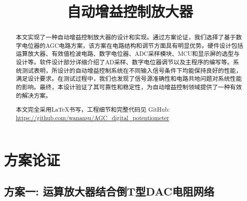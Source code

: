 \documentclass[lang=cn,11pt,a4paper]{elegantpaper}
\title{自动增益控制放大器}
\date{\zhtoday}
\begin{document}
\maketitle

\begin{abstract}
  本文实现了一种自动增益控制放大器的设计和实现。通过方案论证，我们选择了基于数字电位器的AGC电路方案，该方案在电路结构和调节方面具有明显优势。硬件设计包括运算放大器、有效值检波电路、数字电位器、ADC采样模块、MCU和显示屏的选型与设计等。软件设计部分详细介绍了AD采样、数字电位器调节以及主程序的编写等。系统测试表明，所设计的自动增益控制系统在不同输入信号条件下均能保持良好的性能，满足设计要求。在测试过程中，我们也发现了信号源准确性和电路共地问题对系统性能的影响。最终，本设计验证了其可靠性和稳定性，为自动增益控制领域提供了一种有效的解决方案。
  
  本文完全采用\LaTeX{}书写，工程细节和完整代码见 GitHub: \url{https://github.com/wanansu/AGC_digital_potentiometer}
\end{abstract}

\section{方案论证}

\subsection{方案一: 运算放大器结合倒T型DAC电阻网络}
\end{document}
